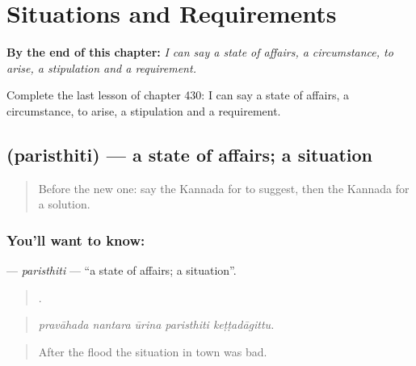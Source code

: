 
\chapter{Situations and Requirements}
\label{ch:ka-situations-and-requirements}

\begin{chapteropening}
\textbf{By the end of this chapter:} \emph{I can say a state of affairs, a circumstance, to arise, a stipulation and a requirement.}

Complete the last lesson of chapter 430: I can say a state of affairs, a circumstance, to arise, a stipulation and a requirement.
\end{chapteropening}

\section[\texorpdfstring{\kn{ಪರಿಸ್ಥಿತಿ} (paristhiti)}{ಪರಿಸ್ಥಿತಿ (paristhiti)}]{ (paristhiti) — a state of affairs; a situation}

\label{lesson:KA-C430-paristhiti}



\begin{quote}
Before the new one: say the Kannada for to suggest, then the Kannada for a solution.
\end{quote}

\subsection*{You'll want to know: }
\textbf{} — \emph{paristhiti} — \textquotedblleft{}a state of affairs; a situation\textquotedblright{}.

\begin{quote}
    .
\end{quote}

\begin{quote}
\emph{pravāhada nantara ūrina paristhiti keṭṭadāgittu.}
\end{quote}

\begin{quote}
After the flood the situation in town was bad.
\end{quote}

